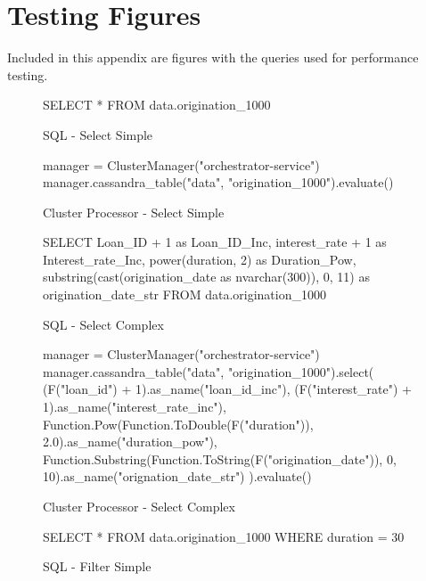 \chapter{Testing Figures}\label{cha:testing-figs}

Included in this appendix are figures with the queries used for performance testing.

\begin{figure}[h]
	\centering
	\begin{SQL}
SELECT * FROM data.origination_1000
	\end{SQL}
	\caption{SQL - Select Simple}
	\label{fig:sql-select-simple}
\end{figure}
	
\begin{figure}[h]
	\begin{python}
manager = ClusterManager("orchestrator-service")
manager.cassandra_table("data", "origination_1000").evaluate()
	\end{python}
	\caption{Cluster Processor - Select Simple}
	\label{fig:cluster-select-simple}
\end{figure}

\begin{figure}[h]
	\centering
	\begin{SQL}
SELECT 
Loan_ID + 1 as Loan_ID_Inc, 
interest_rate + 1 as Interest_rate_Inc, 
power(duration, 2) as Duration_Pow, 
substring(cast(origination_date as nvarchar(300)), 0, 11) as origination_date_str 
FROM data.origination_1000
	\end{SQL}
	\caption{SQL - Select Complex}
	\label{fig:sql-select-complex}
\end{figure}

\begin{figure}[h]
	\begin{python}
manager = ClusterManager("orchestrator-service")
manager.cassandra_table("data", "origination_1000").select(
(F("loan_id") + 1).as_name("loan_id_inc"), 
(F("interest_rate") + 1).as_name("interest_rate_inc"),
Function.Pow(Function.ToDouble(F("duration")), 2.0).as_name("duration_pow"),
Function.Substring(Function.ToString(F("origination_date")), 0, 10).as_name("orignation_date_str")
).evaluate()
	\end{python}
	\caption{Cluster Processor - Select Complex}
	\label{fig:cluster-select-complex}
\end{figure}

\begin{figure}[h]
	\centering
	\begin{SQL}
SELECT *
FROM data.origination_1000
WHERE duration = 30
	\end{SQL}
	\caption{SQL - Filter Simple}
	\label{fig:sql-filter-simple}
\end{figure}

